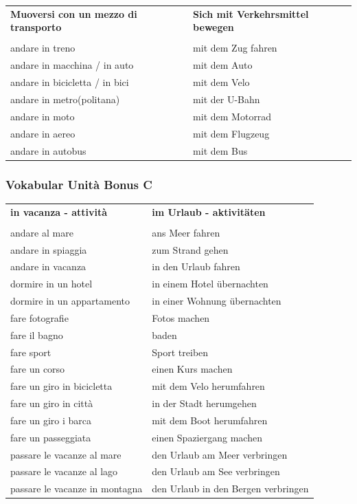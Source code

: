 \documentclass[10pt]{scrartcl}
\begin{document}
\begin{multicols*}{2}
\begin{supertabular}{p{4cm}p{4cm}}
\\
\textbf{Muoversi con un mezzo di transporto} & \textbf{Sich mit Verkehrsmittel bewegen}\\
\\
andare in treno & mit dem Zug fahren\\
andare in macchina / in auto & mit dem Auto\\
andare in bicicletta / in bici & mit dem Velo\\
andare in metro(politana) & mit der U-Bahn\\
andare in moto & mit dem Motorrad\\
andare in aereo & mit dem Flugzeug\\
andare in autobus & mit dem Bus\\
\end{supertabular} 
\subsubsection*{Vokabular Unità Bonus C}
\begin{supertabular}{p{4cm}p{4cm}}
\textbf{in vacanza - attività} & \textbf{im Urlaub - aktivitäten}\\
\\
andare al mare & ans Meer fahren\\
andare in spiaggia & zum Strand gehen\\
andare in vacanza & in den Urlaub fahren\\
dormire in un hotel & in einem Hotel übernachten\\
dormire in un appartamento & in einer Wohnung übernachten\\
fare fotografie & Fotos machen\\
fare il bagno & baden\\
fare sport & Sport treiben\\
fare un corso & einen Kurs machen\\
fare un giro in bicicletta & mit dem Velo herumfahren\\
fare un giro in città & in der Stadt herumgehen\\
fare un giro i barca & mit dem Boot herumfahren\\
fare un passeggiata & einen Spaziergang machen\\
passare le vacanze al mare & den Urlaub am Meer verbringen\\
passare le vacanze al lago & den Urlaub am See verbringen\\
passare le vacanze in montagna & den Urlaub in den Bergen verbringen\\

\end{supertabular}
\end{multicols*}
\end{document}
